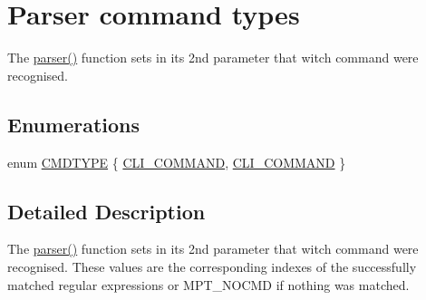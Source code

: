 \hypertarget{group___parser_cmd_type}{\section{Parser command types}
\label{group___parser_cmd_type}
}


The \hyperlink{cli_8c_a2b77bb3c926aaf4689a29038aa774b76}{parser()} function sets in its 2nd parameter that witch command were recognised.  


\subsection*{Enumerations}
\begin{DoxyCompactItemize}
\item 
enum \hyperlink{group___parser_cmd_type_ga8772ddb837dae62899db0754b7606766}{C\-M\-D\-T\-Y\-P\-E} \{ \hyperlink{group___parser_cmd_type_gga8772ddb837dae62899db0754b7606766a3795e7d6003fbb00b8f7f9f781382a20}{C\-L\-I\-\_\-\-C\-O\-M\-M\-A\-N\-D}, 
\hyperlink{group___parser_cmd_type_gga8772ddb837dae62899db0754b7606766a3795e7d6003fbb00b8f7f9f781382a20}{C\-L\-I\-\_\-\-C\-O\-M\-M\-A\-N\-D}
 \}
\end{DoxyCompactItemize}


\subsection{Detailed Description}
The \hyperlink{cli_8c_a2b77bb3c926aaf4689a29038aa774b76}{parser()} function sets in its 2nd parameter that witch command were recognised. These values are the corresponding indexes of the successfully matched regular expressions or M\-P\-T\-\_\-\-N\-O\-C\-M\-D if nothing was matched. 


